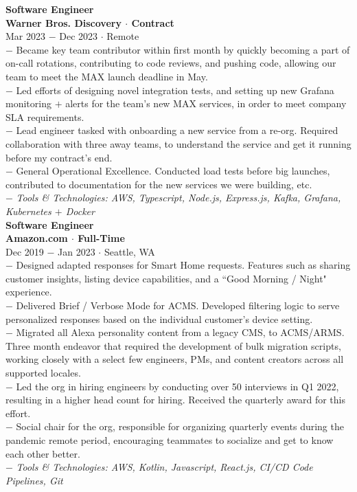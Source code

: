 \documentclass{resume}
\begin{document}
\begin{flushleft}
\normalsize{\bf Software Engineer}\\
\footnotesize{\bf Warner Bros. Discovery $\cdot$ Contract}\\
\footnotesize{Mar 2023 $-$ Dec 2023 $\cdot$ Remote}\\[1mm]
{\scriptsize
	$-$ Became key team contributor within first month by quickly becoming a part of on-call rotations, contributing to code reviews, and pushing code, allowing our team to meet the MAX launch deadline in May.\\
	$-$ Led efforts of designing novel integration tests, and setting up new Grafana monitoring $+$ alerts for the team's new MAX services, in order to meet company SLA requirements.\\
	$-$ Lead engineer tasked with onboarding a new service from a re-org. Required collaboration with three away teams, to understand the service and get it running before my contract's end.\\
	$-$ General Operational Excellence. Conducted load tests before big launches, contributed to documentation for the new services we were building, etc.\\
	$-$ \textit{Tools \& Technologies: AWS, Typescript, Node.js, Express.js, Kafka, Grafana, Kubernetes $+$ Docker}
}\\[3mm]

\normalsize{\bf Software Engineer}\\
\footnotesize{\bf Amazon.com $\cdot$ Full-Time}\\
\footnotesize{Dec 2019 $-$ Jan 2023 $\cdot$ Seattle, WA}\\[1mm]
{\scriptsize
	$-$ Designed adapted responses for Smart Home requests. Features such as sharing customer insights, listing device capabilities, and a ``Good Morning / Night" experience. \\
	$-$ Delivered Brief / Verbose Mode for ACMS. Developed filtering logic to serve personalized responses based on the individual customer's device setting. \\
	$-$ Migrated all Alexa personality content from a legacy CMS, to ACMS/ARMS. Three month endeavor that required the development of bulk migration scripts, working closely with a select few engineers, PMs, and content creators across all supported locales. \\
	$-$ Led the org in hiring engineers by conducting over 50 interviews in Q1 2022, resulting in a higher head count for hiring. Received the quarterly award for this effort. \\
	$-$ Social chair for the org, responsible for organizing quarterly events during the pandemic remote period, encouraging teammates to socialize and get to know each other better. \\
	$-$ \textit{Tools \& Technologies: AWS, Kotlin, Javascript, React.js, CI/CD Code Pipelines, Git}
}\\[3mm]


\end{flushleft}
\end{document}
